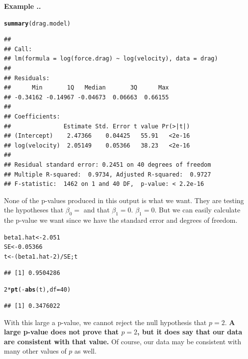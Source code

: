 \documentclass[twoside]{book}\usepackage[]{graphicx}\usepackage[]{xcolor}
\makeatletter
\newcommand{\hlnum}[1]{\textcolor[rgb]{0.686,0.059,0.569}{#1}}%
\newcommand{\hlopt}[1]{\textcolor[rgb]{0,0,0}{#1}}%
\newcommand{\hlstd}[1]{\textcolor[rgb]{0.345,0.345,0.345}{#1}}%
\newcommand{\hlkwb}[1]{\textcolor[rgb]{0.69,0.353,0.396}{#1}}%
\newcommand{\hlkwc}[1]{\textcolor[rgb]{0.333,0.667,0.333}{#1}}%
\newcommand{\hlkwd}[1]{\textcolor[rgb]{0.737,0.353,0.396}{\textbf{#1}}}%
\newenvironment{kframe}{%
 \def\at@end@of@kframe{}%
 \ifinner\ifhmode%
  \def\at@end@of@kframe{\end{minipage}}%
  \begin{minipage}{\columnwidth}%
 \fi\fi%
 \def\FrameCommand##1{\hskip\@totalleftmargin \hskip-\fboxsep
 \colorbox{shadecolor}{##1}\hskip-\fboxsep
     \hskip-\linewidth \hskip-\@totalleftmargin \hskip\columnwidth}%
 \MakeFramed {\advance\hsize-\width
   \@totalleftmargin\z@ \linewidth\hsize
   \@setminipage}}%
 {\par\unskip\endMakeFramed%
 \at@end@of@kframe}
\newenvironment{knitrout}{}{} %
\newcounter{example}[section]
\newenvironment{example}%
{\refstepcounter{example}%
\textbf{Example \thesection.\arabic{example}. }}%
{}
\makeatother
\begin{document}
\begin{example}
\begin{knitrout}
\color{fgcolor}\begin{kframe}
\begin{alltt}
\hlkwd{summary}\hlstd{(drag.model)}
\end{alltt}
\begin{verbatim}
## 
## Call:
## lm(formula = log(force.drag) ~ log(velocity), data = drag)
## 
## Residuals:
##      Min       1Q   Median       3Q      Max 
## -0.34162 -0.14967 -0.04673  0.06663  0.66155 
## 
## Coefficients:
##               Estimate Std. Error t value Pr(>|t|)
## (Intercept)    2.47366    0.04425   55.91   <2e-16
## log(velocity)  2.05149    0.05366   38.23   <2e-16
## 
## Residual standard error: 0.2451 on 40 degrees of freedom
## Multiple R-squared:  0.9734,	Adjusted R-squared:  0.9727 
## F-statistic:  1462 on 1 and 40 DF,  p-value: < 2.2e-16
\end{verbatim}
\end{kframe}
\end{knitrout}
None of the p-values produced in this output is what we want.  
They are testing the hypotheses that $\beta_0=$ and that $\beta_1 = 0$.
$\beta_1 = 0$.  
But we can easily calculate the p-value we want since we have the standard error
and degrees of freedom.
\begin{knitrout}
\color{fgcolor}\begin{kframe}
\begin{alltt}
\hlstd{beta1.hat} \hlkwb{<-} \hlnum{2.051}
\hlstd{SE} \hlkwb{<-} \hlnum{0.05366}
\hlstd{t} \hlkwb{<-}  \hlstd{( beta1.hat} \hlopt{-} \hlnum{2} \hlstd{)} \hlopt{/} \hlstd{SE; t}
\end{alltt}
\begin{verbatim}
## [1] 0.9504286
\end{verbatim}
\begin{alltt}
\hlnum{2} \hlopt{*} \hlkwd{pt}\hlstd{(} \hlopt{-} \hlkwd{abs}\hlstd{(t),} \hlkwc{df}\hlstd{=} \hlnum{40} \hlstd{)}
\end{alltt}
\begin{verbatim}
## [1] 0.3476022
\end{verbatim}
\end{kframe}
\end{knitrout}
With this large a p-value, we cannot reject the null hypothesis that $p=2$.
\textbf{A large p-value does not prove that $p=2$, 
but it does say that our data are consistent with that value.}  
Of course, our data may be consistent with many other values of $p$ as well.
\end{example}
\end{document}
